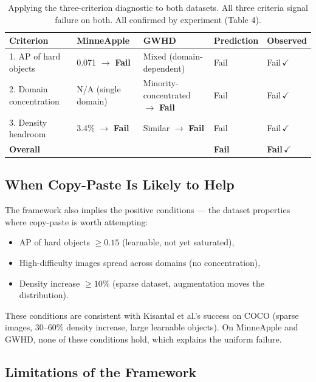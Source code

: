 \documentclass[10pt, a4paper]{article}
\begin{document}
\begin{table}[H]
\centering
\small
\caption{Applying the three-criterion diagnostic to both datasets.
  All three criteria signal failure on both.
  All confirmed by experiment (Table 4).}
\begin{tabular}{lllll}
\toprule
\textbf{Criterion} & \textbf{MinneApple} & \textbf{GWHD}
  & \textbf{Prediction} & \textbf{Observed} \\
\midrule
1. AP of hard objects
  & 0.071 $\to$ \textbf{Fail}
  & Mixed (domain-dependent)
  & Fail & Fail\,$\checkmark$ \\
2. Domain concentration
  & N/A (single domain)
  & Minority-concentrated $\to$ \textbf{Fail}
  & Fail & Fail\,$\checkmark$ \\
3. Density headroom
  & 3.4\% $\to$ \textbf{Fail}
  & Similar $\to$ \textbf{Fail}
  & Fail & Fail\,$\checkmark$ \\
\midrule
\multicolumn{2}{l}{\textbf{Overall}} & & \textbf{Fail} & \textbf{Fail\,$\checkmark$} \\
\bottomrule
\end{tabular}
\end{table}

\subsection{When Copy-Paste Is Likely to Help}

The framework also implies the positive conditions --- the dataset
properties where copy-paste is worth attempting:

\begin{itemize}[nosep, leftmargin=*]
\item AP of hard objects $\geq 0.15$ (learnable, not yet saturated),
\item High-difficulty images spread across domains (no concentration),
\item Density increase $\geq 10\%$ (sparse dataset, augmentation moves
  the distribution).
\end{itemize}

These conditions are consistent with Kisantal et al.'s success on COCO
(sparse images, 30--60\% density increase, large learnable objects).
On MinneApple and GWHD, none of these conditions hold, which explains
the uniform failure.

\subsection{Limitations of the Framework}
\end{document}
